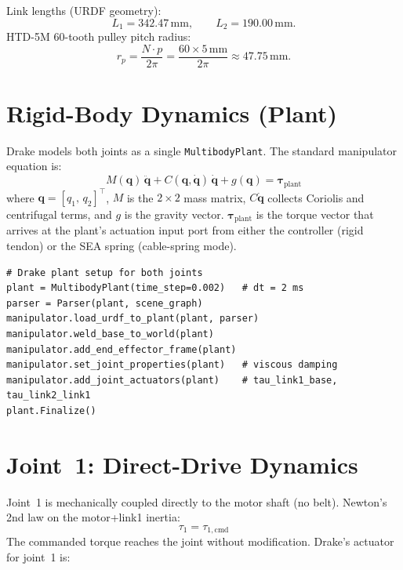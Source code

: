 \documentclass[11pt, a4paper]{article}
\newcommand{\rp}{r_p}
\newcommand{\bq}{\bm{q}}
\newcommand{\bqd}{\dot{\bm{q}}}
\newcommand{\bqdd}{\ddot{\bm{q}}}
\begin{document}
\noindent
Link lengths (URDF geometry):
\[
  L_1 = 342.47\,\text{mm}, \qquad L_2 = 190.00\,\text{mm}.
\]
HTD-5M 60-tooth pulley pitch radius:
\begin{equation}
  \rp = \frac{N \cdot p}{2\pi} = \frac{60 \times 5\,\text{mm}}{2\pi} \approx 47.75\,\text{mm}.
  \label{eq:pulley-radius}
\end{equation}

\section{Rigid-Body Dynamics (Plant)}

Drake models both joints as a single \texttt{MultibodyPlant}.
The standard manipulator equation is:
\begin{equation}
  M(\bq)\,\bqdd + C(\bq,\bqd)\,\bqd + g(\bq) = \bm{\tau}_{\text{plant}}
  \label{eq:eom}
\end{equation}
where $\bq = [q_1,\, q_2]^\top$, $M$ is the $2\times 2$ mass matrix,
$C\bqd$ collects Coriolis and centrifugal terms, and $g$ is the gravity vector.
$\bm{\tau}_{\text{plant}}$ is the torque vector that arrives at the plant's
actuation input port from either the controller (rigid tendon) or the SEA spring
(cable-spring mode).

\begin{lstlisting}
# Drake plant setup for both joints
plant = MultibodyPlant(time_step=0.002)   # dt = 2 ms
parser = Parser(plant, scene_graph)
manipulator.load_urdf_to_plant(plant, parser)
manipulator.weld_base_to_world(plant)
manipulator.add_end_effector_frame(plant)
manipulator.set_joint_properties(plant)   # viscous damping
manipulator.add_joint_actuators(plant)    # tau_link1_base, tau_link2_link1
plant.Finalize()
\end{lstlisting}

\section{Joint~1: Direct-Drive Dynamics}

Joint~1 is mechanically coupled directly to the motor shaft (no belt).
Newton's 2nd law on the motor+link1 inertia:
\begin{equation}
  \tau_1 = \tau_{1,\text{cmd}}
  \label{eq:j1-direct}
\end{equation}
The commanded torque reaches the joint without modification.
Drake's actuator for joint~1 is:
\end{document}
